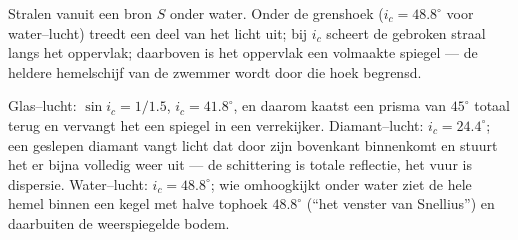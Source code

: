 \begin{omfigure}

{\small Stralen vanuit een bron $S$ onder water. Onder de grenshoek
($i_c = 48.8^\circ$ voor water--lucht) treedt een deel van het licht uit; bij
$i_c$ scheert de gebroken straal langs het oppervlak; daarboven is het
oppervlak een volmaakte spiegel --- de heldere hemelschijf van de zwemmer wordt
door die hoek begrensd.}
\end{omfigure}

\begin{example}\label{ex:b1:rays-reflection-refraction:tir}
Glas--lucht: $\sin i_c = 1/1.5$, $i_c = 41.8^\circ$, en daarom kaatst een
prisma van $45^\circ$ totaal terug en vervangt het een spiegel in een verrekijker.
Diamant--lucht: $i_c = 24.4^\circ$; een geslepen diamant vangt licht dat door
zijn bovenkant binnenkomt en stuurt het er bijna volledig weer uit --- de
schittering is totale reflectie, het vuur is dispersie. Water--lucht:
$i_c = 48.8^\circ$; wie omhoogkijkt onder water ziet de hele hemel binnen een
kegel met halve tophoek $48.8^\circ$ (``het venster van Snellius'') en
daarbuiten de weerspiegelde bodem.
\end{example}

